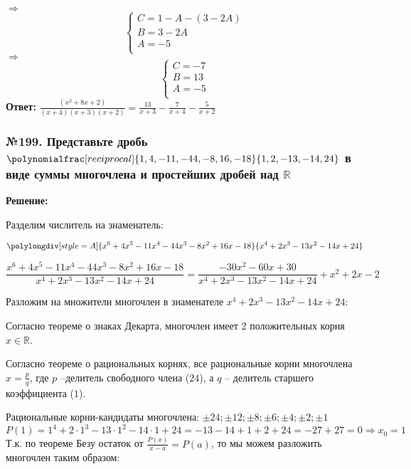 \documentclass[a4paper]{article}
\begin{document}
$\Rightarrow$
\begin{equation*}
 \begin{cases}
	C=1-A-(3-2A) \\
	B=3-2A \\
	A=-5 \\
 \end{cases}
\end{equation*}
$\Rightarrow$
\begin{equation*}
 \begin{cases}
	C=-7 \\
	B=13 \\
	A=-5 \\
 \end{cases}
\end{equation*}
\textbf{Ответ:} $\frac{(x^2+8x+2)}{(x+4)(x+3)(x+2)}=\frac{13}{x+3}-\frac{7}{x+4}-\frac{5}{x+2}$

\subsubsection*{№199. Представьте дробь $\polynomialfrac[reciprocal]{1,4,-11,-44,-8,16,-18}{1,2,-13,-14,24}$ в виде суммы многочлена и простейших дробей над $\mathbb{R}$}
\textbf{Решение:} \par
Разделим числитель на знаменатель: \par
\[\polylongdiv[style=A]{x^6+4x^5-11x^4-44x^3-8x^2+16x-18}{x^4+2x^3-13x^2-14x+24}\] \par
\[\frac{x^6+4x^5-11x^4-44x^3-8x^2+16x-18}{x^4+2x^3-13x^2-14x+24}=\frac{-30x^2-60x+30}{x^4+2x^3-13x^2-14x+24}+x^2+2x-2\]

Разложим на множители многочлен в знаменателе $x^4+2x^3-13x^2-14x+24$: \par
Согласно теореме о знаках Декарта, многочлен имеет 2 положительных корня $x \in \mathbb{R}$. \par
Согласно теореме о рациональных корнях, все рациональные корни многочлена $x=\frac{p}{q}$, где $p$ --делитель свободного члена ($24$), а $q$ -- делитель старшего коэффициента ($1$). \par
Рациональные корни-кандидаты многочлена: $\pm24; \pm12; \pm8; \pm6; \pm4; \pm2; \pm1$
\[P(1)=1^4+2\cdot1^3-13\cdot1^2-14\cdot1+24=-13-14+1+2+24=-27+27=0 \Rightarrow x_0=1\]
Т.к. по теореме Безу остаток от $\frac{P(x)}{x-a}=P(a)$, то мы можем разложить многочлен таким образом: \par
{}
\end{document}
